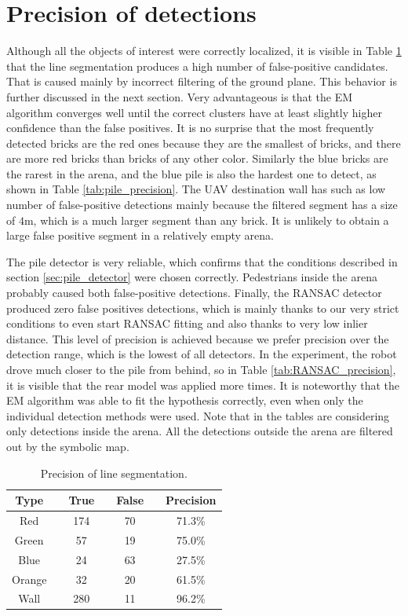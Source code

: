 \section{Precision of detections}
Although all the objects of interest were correctly localized, it is visible in Table \ref{tab:seg_precision} that the line segmentation produces a high number of false-positive candidates. That is caused mainly by incorrect filtering of the ground plane. This behavior is further discussed in the next section. Very advantageous is that the EM algorithm converges well until the correct clusters have at least slightly higher confidence than the false positives. It is no surprise that the most frequently detected bricks are the red ones because they are the smallest of bricks, and there are more red bricks than bricks of any other color. Similarly the blue bricks are the rarest in the arena, and the blue pile is also the hardest one to detect, as shown in Table \ref{tab:pile_precision}. The UAV destination wall has such as low number of false-positive detections mainly because the filtered segment has a size of $4$m, which is a much larger segment than any brick. It is unlikely to obtain a large false positive segment in a relatively empty arena.

The pile detector is very reliable, which confirms that the conditions described in section \ref{sec:pile_detector} were chosen correctly. Pedestrians inside the arena probably caused both false-positive detections. Finally, the RANSAC detector produced zero false positives detections, which is mainly thanks to our very strict conditions to even start RANSAC fitting and also thanks to very low inlier distance. This level of precision is achieved because we prefer precision over the detection range, which is the lowest of all detectors. In the experiment, the robot drove much closer to the pile from behind, so in Table \ref{tab:RANSAC_precision}, it is visible that the rear model was applied more times. It is noteworthy that the EM algorithm was able to fit the hypothesis correctly, even when only the individual detection methods were used. Note that in the tables are considering only detections inside the arena. All the detections outside the arena are filtered out by the symbolic map.

\begin{table}[H]
	\centering
	\caption{Precision of line segmentation.}
	\begin{tabular}{ccccccc}
		\toprule
		Type &\quad& True &\quad& False &\quad& Precision \\
		\midrule
		Red &\quad& 174 &\quad& 70 &\quad&71.3\% \\
		Green &\quad& 57 &\quad& 19 &\quad& 75.0\% \\
		Blue &\quad& 24 &\quad& 63 &\quad& 27.5\% \\
		Orange &\quad& 32 &\quad& 20 &\quad& 61.5\% \\
		Wall &\quad& 280 &\quad& 11 &\quad& 96.2\% \\
		\bottomrule
	\end{tabular}
	\label{tab:seg_precision}
\end{table}


